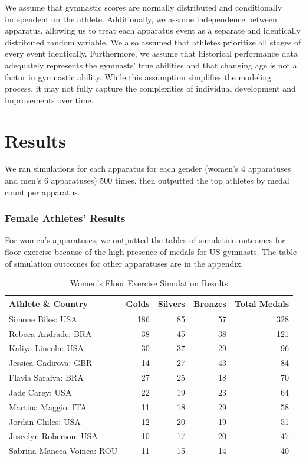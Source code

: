 \documentclass[
  10.5pt,
  letterpaper,
  DIV=11,
  numbers=noendperiod]{scrartcl}
\begin{document}
We assume that gymnastic scores are normally distributed and
conditionally independent on the athlete. Additionally, we assume
independence between apparatus, allowing us to treat each apparatus
event as a separate and identically distributed random variable. We also
assumed that athletes prioritize all stages of every event identically.
Furthermore, we assume that historical performance data adequately
represents the gymnasts' true abilities and that changing age is not a
factor in gymnastic ability. While this assumption simplifies the
modeling process, it may not fully capture the complexities of
individual development and improvements over time.

\hypertarget{results}{%
\section{Results}\label{results}}

We ran simulations for each apparatus for each gender (women's 4
apparatuses and men's 6 apparatuses) 500 times, then outputted the top
athletes by medal count per apparatus.

\hypertarget{female-athletes-results}{%
\subsubsection{Female Athletes' Results}\label{female-athletes-results}}

For women's apparatuses, we outputted the tables of simulation outcomes
for floor exercise because of the high presence of medals for US
gymnasts. The table of simulation outcomes for other apparatuses are in
the appendix.

\begin{table}[H]

\caption{Women's Floor Exercise Simulation Results }
\centering
\fontsize{8}{10}\selectfont
\begin{tabular}[t]{l|r|r|r|r}
\hline
Athlete \& Country & Golds & Silvers & Bronzes & Total Medals\\
\hline
Simone Biles: USA & 186 & 85 & 57 & 328\\
\hline
Rebeca Andrade: BRA & 38 & 45 & 38 & 121\\
\hline
Kaliya Lincoln: USA & 30 & 37 & 29 & 96\\
\hline
Jessica Gadirova: GBR & 14 & 27 & 43 & 84\\
\hline
Flavia Saraiva: BRA & 27 & 25 & 18 & 70\\
\hline
Jade Carey: USA & 22 & 19 & 23 & 64\\
\hline
Martina Maggio: ITA & 11 & 18 & 29 & 58\\
\hline
Jordan Chiles: USA & 12 & 20 & 19 & 51\\
\hline
Joscelyn Roberson: USA & 10 & 17 & 20 & 47\\
\hline
Sabrina Maneca Voinea: ROU & 11 & 15 & 14 & 40\\
\hline
\end{tabular}
\end{table}
\end{document}
